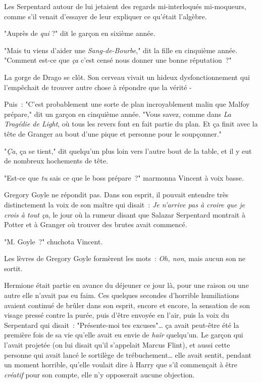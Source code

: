 Les Serpentard autour de lui jetaient des regards mi-interloqués mi-moqueurs, comme s'il venait d'essayer de leur expliquer ce qu'était l'algèbre.

"Auprès de \emph{qui} ?" dit le garçon en sixième année.

"Mais tu viens d'aider une \emph{Sang-de-Bourbe}," dit la fille en cinquième année. "Comment est-ce que \emph{ça} c'est censé nous donner une bonne réputation~?"

La gorge de Drago se clôt. Son cerveau vivait un hideux dysfonctionnement qui l'empêchait de trouver autre chose à répondre que la vérité -

Puis~: "C'est probablement une sorte de plan incroyablement malin que Malfoy prépare," dit un garçon en cinquième année. "Vous savez, comme dans \emph{La Tragédie de Light}, où tous les revers font en fait partie du plan. Et ça finit avec la tête de Granger au bout d'une pique et personne pour le soupçonner."

"\emph{Ça}, ça se tient," dit quelqu'un plus loin vers l'autre bout de la table, et il y eut de nombreux hochements de tête.

\later

"Est-ce que \emph{tu} sais ce que le boss prépare~?" marmonna Vincent à voix basse.

Gregory Goyle ne répondit pas. Dans son esprit, il pouvait entendre très distinctement la voix de son maître qui disait~: \emph{Je n'arrive pas à croire que je crois à tout ça}, le jour où la rumeur disant que Salazar Serpentard montrait à Potter et à Granger où trouver des brutes avait commencé.

"M. Goyle~?" chuchota Vincent.

Les lèvres de Gregory Goyle formèrent les mots~: \emph{Oh, non}, mais aucun son ne sortit.

\later

Hermione était partie en avance du déjeuner ce jour là, pour une raison ou une autre elle n'avait pas eu faim. Ces quelques secondes d'horrible humiliations avaient continué de brûler dans son esprit, encore et encore, la sensation de son visage pressé contre la purée, puis d'être envoyée en l'air, puis la voix du Serpentard qui disait~: "Présente-moi tes excuses"… ça avait peut-être été la première fois de sa vie qu'elle avait eu envie de \emph{haïr} quelqu'un. Le garçon qui l'avait projetée (on lui disait qu'il s'appelait Marcus Flint), et aussi cette personne qui avait lancé le sortilège de trébuchement… elle avait sentit, pendant un moment horrible, qu'elle voulait dire à Harry que s'il commençait à être \emph{créatif} pour son compte, elle n'y opposerait aucune objection.

